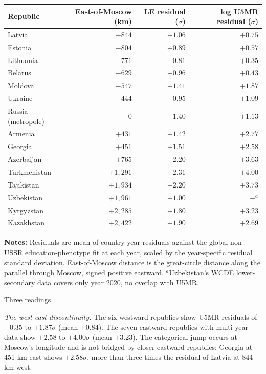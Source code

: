 \documentclass[12pt,letterpaper]{article}
\begin{document}
{\small\setlength{\tabcolsep}{4pt}
\begin{longtable}[]{@{}lrrr@{}}
\toprule
Republic & East-of-Moscow (km) & LE residual ($\sigma$) & log U5MR residual ($\sigma$) \\
\midrule
\endhead
Latvia            & $-844$  & $-1.06$ & $+0.75$ \\
Estonia           & $-804$  & $-0.89$ & $+0.57$ \\
Lithuania         & $-771$  & $-0.81$ & $+0.35$ \\
Belarus           & $-629$  & $-0.96$ & $+0.43$ \\
Moldova           & $-547$  & $-1.41$ & $+1.87$ \\
Ukraine           & $-444$  & $-0.95$ & $+1.09$ \\
Russia (metropole) & $0$    & $-1.40$ & $+1.13$ \\
Armenia           & $+431$  & $-1.42$ & $+2.77$ \\
Georgia           & $+451$  & $-1.51$ & $+2.58$ \\
Azerbaijan        & $+765$  & $-2.20$ & $+3.63$ \\
Turkmenistan      & $+1{,}291$ & $-2.31$ & $+4.00$ \\
Tajikistan        & $+1{,}934$ & $-2.20$ & $+3.73$ \\
Uzbekistan        & $+1{,}961$ & $-1.00$ & $-{}^{a}$ \\
Kyrgyzstan        & $+2{,}285$ & $-1.80$ & $+3.23$ \\
Kazakhstan        & $+2{,}422$ & $-1.90$ & $+2.69$ \\
\bottomrule
\end{longtable}}\addtocounter{table}{-1}%

\begin{minipage}{\dimexpr\textwidth-2em}
\scriptsize
\textbf{Notes:} Residuals are mean of country-year residuals against
the global non-USSR education-phenotype fit at each year, scaled by
the year-specific residual standard deviation. East-of-Moscow distance
is the great-circle distance along the parallel through Moscow,
signed positive eastward. $^{a}$Uzbekistan's WCDE lower-secondary
data covers only year 2020, no overlap with U5MR.
\end{minipage}

Three readings.

\textit{The west-east discontinuity.} The six westward republics
show U5MR residuals of $+0.35$ to $+1.87\sigma$ (mean $+0.84$). The
seven eastward republics with multi-year data show $+2.58$ to
$+4.00\sigma$ (mean $+3.23$). The categorical jump occurs at Moscow's
longitude and is not bridged by closer eastward republics: Georgia at
451 km east shows $+2.58\sigma$, more than three times the residual
of Latvia at 844 km west.
\end{document}
